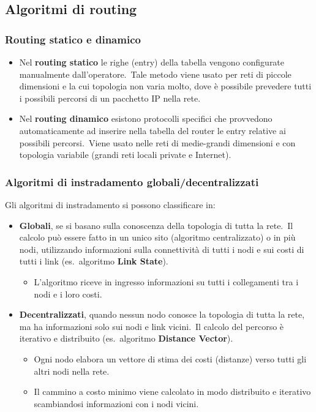 \subsection{Algoritmi di routing}

\subsubsection{Routing statico e dinamico}

\begin{itemize}
    \item Nel \textbf{routing statico} le righe (entry) della tabella vengono configurate manualmente dall’operatore.\
          Tale metodo viene usato per reti di piccole dimensioni e la cui topologia non varia molto, dove è possibile prevedere tutti i possibili percorsi di un pacchetto IP nella rete.
    \item Nel \textbf{routing dinamico} esistono protocolli specifici che provvedono automaticamente ad inserire nella tabella del router le entry relative ai possibili percorsi.\
          Viene usato nelle reti di medie-grandi dimensioni e con topologia variabile (grandi reti locali private e Internet).
\end{itemize}

\subsubsection{Algoritmi di instradamento globali/decentralizzati}

Gli algoritmi di instradamento si possono classificare in:
\begin{itemize}
    \item \textbf{Globali}, se si basano sulla conoscenza della topologia di tutta la rete.\
          Il calcolo può essere fatto in un unico sito (algoritmo centralizzato) o in più nodi, utilizzando informazioni sulla connettività di tutti i nodi e sui costi di tutti i link (es.\ algoritmo \textbf{Link State}).
          \begin{itemize}
              \item L’algoritmo riceve in ingresso informazioni su tutti i collegamenti tra i nodi e i loro costi.
          \end{itemize}
    \item \textbf{Decentralizzati}, quando nessun nodo conosce la topologia di tutta la rete, ma ha informazioni solo sui nodi e link vicini.\
          Il calcolo del percorso è iterativo e distribuito (es.\ algoritmo \textbf{Distance Vector}).
          \begin{itemize}
              \item Ogni nodo elabora un vettore di stima dei costi (distanze) verso tutti gli altri nodi nella rete.
              \item Il cammino a costo minimo viene calcolato in modo distribuito e iterativo scambiandosi informazioni con i nodi vicini.
          \end{itemize}

\end{itemize}


